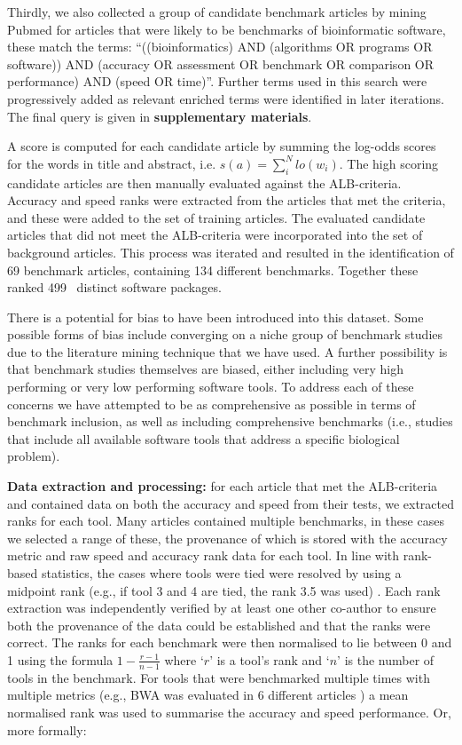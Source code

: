 \documentclass[fleqn,10pt]{SelfArx} %
\def\numTools{499}
\def\numBenchmarkPubs{69}
\def\numBenchmarks{134}
\begin{document}
Thirdly, we also collected a group of candidate benchmark articles by
mining Pubmed for articles that were likely to be benchmarks of
bioinformatic software, these match the terms: “((bioinformatics)
AND (algorithms OR programs OR software)) AND (accuracy OR assessment
OR benchmark OR comparison OR performance) AND (speed OR
time)”. Further terms used in this search were progressively added as
relevant enriched terms were identified in later iterations. The final
query is given in \textbf{supplementary materials}.

A score is computed for each candidate article by summing the log-odds
scores for the words in title and abstract,
i.e. $s(a)=\sum_i^Nlo(w_i)$. The high scoring candidate articles are
then manually evaluated against the ALB-criteria. Accuracy and speed
ranks were extracted from the articles that met the criteria, and
these were added to the set of training articles. The evaluated
candidate articles that did not meet the ALB-criteria were incorporated
into the set of background articles. This process was iterated and resulted in the identification of
{\color{black}\numBenchmarkPubs} benchmark articles,
containing {\color{black}\numBenchmarks} different benchmarks. Together these
ranked {\color{black}\numTools~} distinct software packages.

There is a potential for bias to have been introduced into this
dataset. Some possible forms of bias include converging on a niche
group of benchmark studies due to the literature mining technique that
we have used. A further possibility is that benchmark studies
themselves are biased, either including very high performing or very
low performing software tools. To address each of these concerns we
have attempted to be as comprehensive as possible in terms of
benchmark inclusion, as well as including comprehensive benchmarks (i.e.,
studies that include all available software tools that
address a specific biological problem).

\textbf{Data extraction and processing:} for each article that met the
ALB-criteria and contained data on both the accuracy and speed from
their tests, we extracted ranks for each tool. Many articles contained
multiple benchmarks, in these cases we selected a range of these, the
provenance of which is stored with the accuracy metric and raw speed
and accuracy rank data for each tool. In line with rank-based
statistics, the cases where tools were tied were resolved by using a
midpoint rank (e.g., if tool 3 and 4 are tied, the rank 3.5 was used)
\cite{Mann1947-re}. Each rank extraction was independently verified by
at least one other co-author to ensure both the provenance of the data
could be established and that the ranks were correct. The ranks for
each benchmark were then normalised to lie between 0 and 1 using the
formula $1-\frac{r-1}{n-1}$ where ‘$r$’ is a tool’s rank and ‘$n$’ is the
number of tools in the benchmark. For tools that were benchmarked
multiple times with multiple metrics (e.g., BWA was evaluated in 6
different articles
\cite{Bao2011-lv,Caboche2014-lj,Hatem2013-cs,Schbath2012-ob,Ruffalo2011-rl,Holtgrewe2011-fd})
a mean normalised rank was used to summarise the accuracy and speed performance. 
Or, more formally:
 
\end{document}
